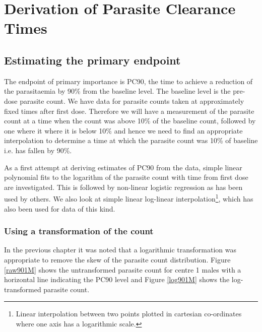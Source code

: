 \chapter{Derivation of Parasite Clearance Times}\label{derivation}
\section{Estimating the primary endpoint}
The endpoint of primary importance is PC90, the time to achieve a reduction of the parasitaemia by 90\% from the baseline level. The baseline level is the pre-dose parasite count. We have data for parasite counts taken at approximately fixed times after first dose. Therefore we will have a measurement of the parasite count at a time when the count was above 10\% of the baseline count, followed by one where it where it is below 10\% and hence we need to find an appropriate interpolation to determine a time at which the parasite count was 10\% of baseline i.e. has fallen by 90\%.

As a first attempt at deriving estimates of PC90 from the data, simple linear polynomial fits to the logarithm of the parasite count with time from first dose are investigated. This is followed by non-linear logistic regression as has been used by others\cite{wootton}. We also look at simple linear log-linear interpolation\footnote{Linear interpolation between two points plotted in cartesian co-ordinates where one axis has a logarithmic scale.}, which has also been used for data of this kind\cite{carmello}.
\subsection{Using a transformation of the count}
In the previous chapter it was noted that a logarithmic transformation was appropriate to remove the skew of the parasite count distribution. Figure \ref{raw901M} shows the untransformed parasite count for centre 1 males with a horizontal line indicating the PC90 level and Figure \ref{log901M} shows the log-transformed parasite count.

